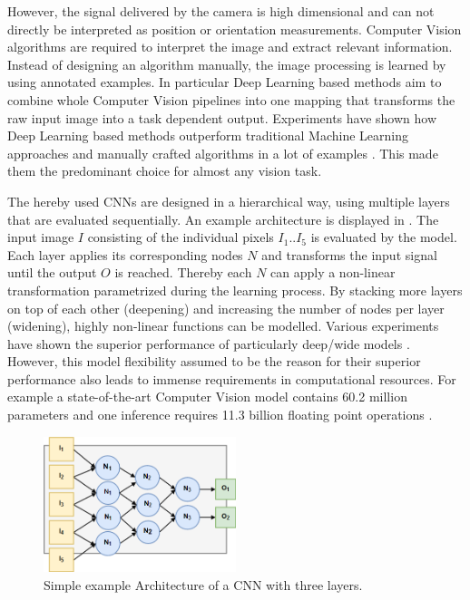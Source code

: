However, the signal delivered by the camera is high dimensional and can not directly be interpreted as position or orientation measurements. Computer Vision algorithms are required to interpret the image and extract relevant information. Instead of designing an algorithm manually, the image processing is learned by using annotated examples. In particular Deep Learning based methods aim to combine whole Computer Vision pipelines into one mapping that transforms the raw input image into a task dependent output. Experiments have shown how Deep Learning based methods outperform traditional Machine Learning approaches and manually crafted algorithms in a lot of examples \cite{Razavian}. This made them the predominant choice for almost any vision task.

The hereby used \acp{CNN} are designed in a hierarchical way, using multiple layers that are evaluated sequentially. An example architecture is displayed in . The input image $I$ consisting of the individual pixels $I_1 .. I_5$ is evaluated by the model. Each layer applies its corresponding nodes $N$ and transforms the input signal until the output $O$ is reached. Thereby each $N$ can apply a non-linear transformation parametrized during the learning process. By stacking more layers on top of each other (deepening) and increasing the number of nodes per layer (widening), highly non-linear functions can be modelled. Various experiments have shown the superior performance of particularly deep/wide models \cite{He, He2015, Szegedy2014, Zagoruyko2016}. However, this model flexibility assumed to be the reason for their superior performance also leads to immense requirements in computational resources. For example a state-of-the-art Computer Vision model \cite{He2015} contains 60.2 million parameters and one inference requires 11.3 billion floating point operations \cite{Tschannen2017}. 

\begin{figure}[bhtp]
	\centering
	\includegraphics[width=0.5\textwidth]{fig/cnn_example}
	\caption{Simple example Architecture of a \ac{CNN} with three layers.}
	\label{fig:cnn_example}
\end{figure}

